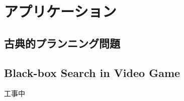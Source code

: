 \documentclass{book}
\begin{document}
\begin{comment}
\chapter{ヒューリスティック関数}
\section{ドメイン固有のヒューリスティック}
\section{緩和問題}
\end{comment}

\chapter{アプリケーション}
\section{古典的プランニング問題}

\section{Black-box Search in Video Game}
工事中

\begin{comment}
\section{Multiple Sequence Alignment}
工事中

\section{Model Checking}
工事中

\end{comment}


\begin{comment}
\chapter{関連分野}
\subsection{ゲーム木探索}
工事中

\section{制約充足問題}
工事中

\end{comment}





\end{document}
